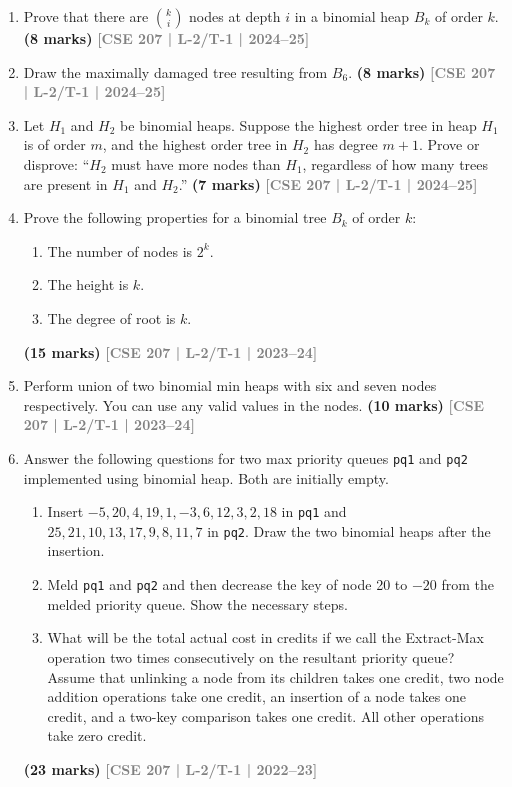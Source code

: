 \documentclass[12pt,a3paper]{article}
\newcommand{\yr}[1]{\hfill\textcolor{gray}{\small\textbf{[#1]}}}
\newcommand{\mk}[1]{\textcolor{orange!70!black}{\small\textbf{(#1 marks)}}}
\begin{document}
\begin{enumerate}

\item Prove that there are $\binom{k}{i}$ nodes at depth $i$ in a binomial heap $B_k$ of order $k$.
\mk{8} \yr{CSE 207 | L-2/T-1 | 2024--25}

\item Draw the maximally damaged tree resulting from $B_6$.
\mk{8} \yr{CSE 207 | L-2/T-1 | 2024--25}

\item Let $H_1$ and $H_2$ be binomial heaps. Suppose the highest order tree in heap $H_1$ is of order $m$, and the highest order tree in $H_2$ has degree $m+1$. Prove or disprove: ``$H_2$ must have more nodes than $H_1$, regardless of how many trees are present in $H_1$ and $H_2$.''
\mk{7} \yr{CSE 207 | L-2/T-1 | 2024--25}

\item Prove the following properties for a binomial tree $B_k$ of order $k$:
\begin{enumerate}
  \item The number of nodes is $2^k$.
  \item The height is $k$.
  \item The degree of root is $k$.
\end{enumerate}
\mk{15} \yr{CSE 207 | L-2/T-1 | 2023--24}

\item Perform union of two binomial min heaps with six and seven nodes respectively. You can use any valid values in the nodes.
\mk{10} \yr{CSE 207 | L-2/T-1 | 2023--24}

\item Answer the following questions for two max priority queues \texttt{pq1} and \texttt{pq2} implemented using binomial heap. Both are initially empty.
\begin{enumerate}
  \item Insert $-5, 20, 4, 19, 1, -3, 6, 12, 3, 2, 18$ in \texttt{pq1} and $25, 21, 10, 13, 17, 9, 8, 11, 7$ in \texttt{pq2}. Draw the two binomial heaps after the insertion.
  \item Meld \texttt{pq1} and \texttt{pq2} and then decrease the key of node 20 to $-20$ from the melded priority queue. Show the necessary steps.
  \item What will be the total actual cost in credits if we call the Extract-Max operation two times consecutively on the resultant priority queue? Assume that unlinking a node from its children takes one credit, two node addition operations take one credit, an insertion of a node takes one credit, and a two-key comparison takes one credit. All other operations take zero credit.
\end{enumerate}
\mk{23} \yr{CSE 207 | L-2/T-1 | 2022--23}


\end{enumerate}
\end{document}
